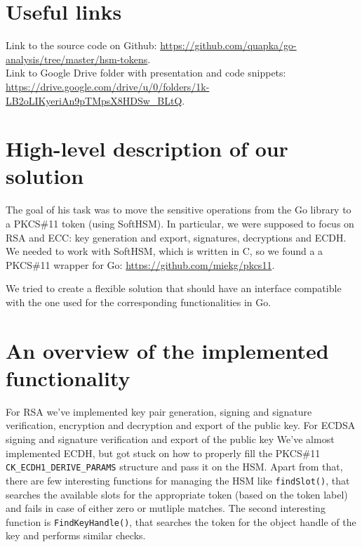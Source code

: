 \documentclass[a4paper]{scrartcl}
\subtitle{}
\begin{document}

\section{Useful links}
Link to the source code on Github: \url{https://github.com/quapka/go-analysis/tree/master/hsm-tokens}.\\
Link to Google Drive folder with presentation and code snippets: \url{https://drive.google.com/drive/u/0/folders/1k-LB2oLIKyeriAn9pTMpsX8HDSw_BLtQ}.

\section{High-level description of our solution }
The goal of his task was to move the sensitive operations from the Go library to a PKCS\#11 token (using SoftHSM). In particular, we were supposed to focus on RSA and ECC: key generation and export, signatures, decryptions and ECDH. We needed to work with SoftHSM, which is written in C, so we found a a PKCS\#11 wrapper for Go: \url{https://github.com/miekg/pkcs11}.

We tried to create a flexible solution that should have an interface compatible with the one used for the corresponding functionalities in Go.


\section{An overview of the implemented functionality}
For RSA we've implemented key pair generation, signing and signature verification, encryption and decryption and export of the public key. For ECDSA signing and signature verification and export of the public key We've almost implemented ECDH, but got stuck on how to properly fill the PKCS\#11 \verb+CK_ECDH1_DERIVE_PARAMS+ structure and pass it on the HSM. Apart from that, there are few interesting functions for managing the HSM like \lstinline[columns=fixed]{findSlot()}, that searches the available slots for the appropriate token (based on the token label) and fails in case of either zero or mutliple matches. The second interesting function is \lstinline[columns=fixed]{FindKeyHandle()}, that searches the token for the object handle of the key and performs similar checks.
\end{document}
